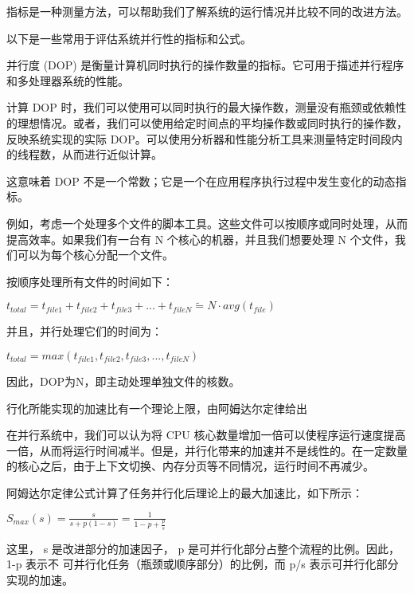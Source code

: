 
指标是一种测量方法，可以帮助我们了解系统的运行情况并比较不同的改进方法。

以下是一些常用于评估系统并行性的指标和公式。


并行度 (DOP) 是衡量计算机同时执行的操作数量的指标。它可用于描述并行程序和多处理器系统的性能。

计算 DOP 时，我们可以使用可以同时执行的最大操作数，测量没有瓶颈或依赖性的理想情况。或者，我们可以使用给定时间点的平均操作数或同时执行的操作数，反映系统实现的实际 DOP。可以使用分析器和性能分析工具来测量特定时间段内的线程数，从而进行近似计算。

这意味着 DOP 不是一个常数；它是一个在应用程序执行过程中发生变化的动态指标。

例如，考虑一个处理多个文件的脚本工具。这些文件可以按顺序或同时处理，从而提高效率。如果我们有一台有 N 个核心的机器，并且我们想要处理 N 个文件，我们可以为每个核心分配一个文件。

按顺序处理所有文件的时间如下：

\begin{center}
$t_{total} = t_{file1} + t_{file2} + t_{file3} + ... + t_{fileN} \widetilde{=} N · avg(t_{file}) $
\end{center}

并且，并行处理它们的时间为：

\begin{center}
$t_{total} = max(t_{file1}, t_{file2}, t_{file3}, ..., t_{fileN}) $
\end{center}

因此，DOP为N，即主动处理单独文件的核数。

行化所能实现的加速比有一个理论上限，由阿姆达尔定律给出


在并行系统中，我们可以认为将 CPU 核心数量增加一倍可以使程序运行速度提高一倍，从而将运行时间减半。但是，并行化带来的加速并不是线性的。在一定数量的核心之后，由于上下文切换、内存分页等不同情况，运行时间不再减少。

阿姆达尔定律公式计算了任务并行化后理论上的最大加速比，如下所示：

\begin{center}
$S_{max}(s) = \frac{s}{s + p(1 - s)} = \frac{1}{1 - p + \frac{p}{s}}$
\end{center}

这里， s 是改进部分的加速因子， p 是可并行化部分占整个流程的比例。因此， 1-p 表示不
可并行化任务（瓶颈或顺序部分）的比例，而 p/s 表示可并行化部分实现的加速。

